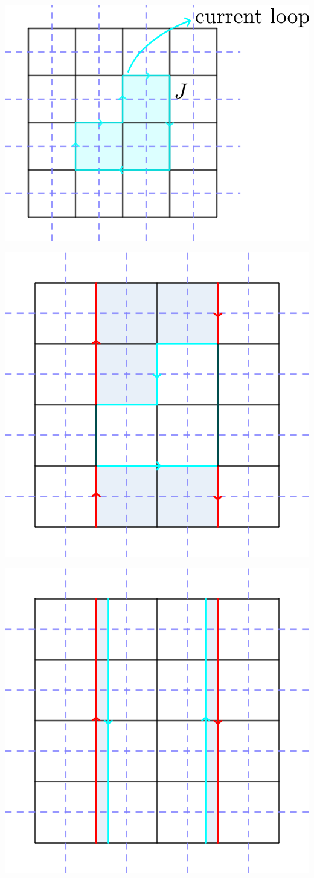 \documentclass[a4paper,11pt]{article}
\begin{document}
\begin{minipage}{0.3\linewidth}
    \centering
    \includegraphics[width = 0.7\linewidth]{EM_matter.pdf}
\end{minipage}
\begin{minipage}{0.3\linewidth}
    \centering
    \includegraphics[width = 0.55\linewidth]{EM_matter_wilson.pdf}
\end{minipage}
\begin{minipage}{0.3\linewidth}
    \centering
    \includegraphics[width = 0.55\linewidth]{screening.pdf}
\end{minipage}
\end{document}
